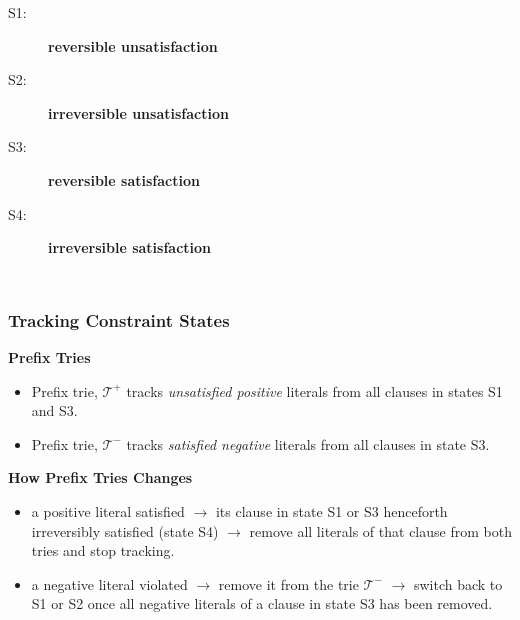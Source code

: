 \documentclass[10pt,aspectratio=43]{beamer}
\begin{document}
\begin{frame}
\begin{columns}[c]
            \begin{description}
                \item[S1:] \textbf{reversible unsatisfaction}
                \item[S2:] \textbf{irreversible unsatisfaction}
                \item[S3:] \textbf{reversible satisfaction}
                \item[S4:] \textbf{irreversible satisfaction}
            \end{description}
        \end{columns}
    \end{frame}
    
    \begin{frame}
        \frametitle{\textbf{Tracking Constraint States}}
        \begin{block}{\textbf{Prefix Tries}}
            \begin{itemize}
                \item Prefix trie, $\mathcal{T}^{+}$ tracks \emph{unsatisfied positive} literals from all clauses in states S1 and S3.
                \item Prefix trie, $\mathcal{T}^{-}$  tracks \emph{satisfied negative} literals from all clauses in state S3.
            \end{itemize}
        \end{block}
        \begin{block}{\textbf{How Prefix Tries Changes}}
            \begin{itemize}
                \item a positive literal satisfied $\rightarrow$ its clause in state S1 or S3 henceforth irreversibly satisfied (state S4) $\rightarrow$ remove all literals of that clause from both tries and stop tracking.
                \item a negative literal violated $\rightarrow$ remove it from the trie $\mathcal{T}^{-}$ $\rightarrow$ switch back to S1 or S2 once all negative literals of a clause in state S3 has been removed.
            \end{itemize}
        \end{block}
    \end{frame}
    
\end{document}

